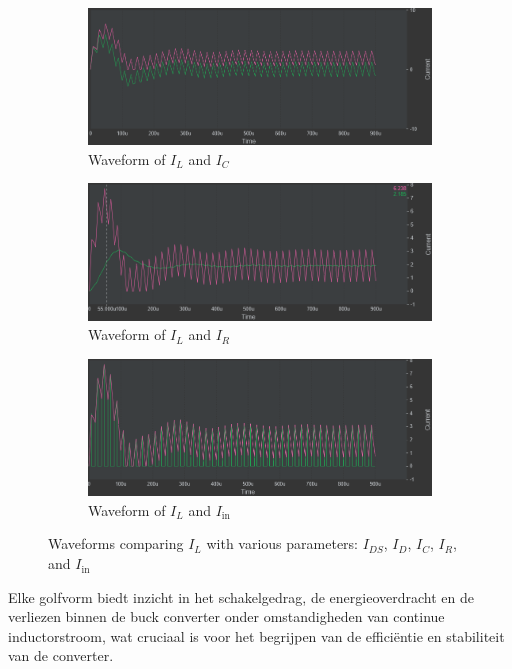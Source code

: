 \begin{figure}[h!]
    \begin{subfigure}[b]{0.45\linewidth}
        \centering
        \includegraphics[width=\linewidth]{img/hfd2/IL-IC.png}
        \caption{Waveform of \(I_{L}\) and \(I_{C}\)}
        \label{fig:Waveform_IL_IC}
    \end{subfigure}
    \hfill
    \begin{subfigure}[b]{0.45\linewidth}
        \centering
        \includegraphics[width=\linewidth]{img/hfd2/IL-IR.png}
        \caption{Waveform of \(I_{L}\) and \(I_{R}\)}
        \label{fig:Waveform_IL_IR}
    \end{subfigure}
    
    \begin{subfigure}[b]{0.45\linewidth}
        \centering
        \includegraphics[width=\linewidth]{img/hfd2/IL-Lin.png}
        \caption{Waveform of \(I_{L}\) and \(I_{\text{in}}\)}
        \label{fig:Waveform_IL_Lin}
    \end{subfigure}
    
    \caption{Waveforms comparing \(I_{L}\) with various parameters: \(I_{DS}\), \(I_{D}\), \(I_{C}\), \(I_{R}\), and \(I_{\text{in}}\)}
    \label{fig:Waveforms_IL_all}
\end{figure}

Elke golfvorm biedt inzicht in het schakelgedrag, de energieoverdracht en de verliezen binnen de buck converter onder omstandigheden van continue inductorstroom, wat cruciaal is voor het begrijpen van de efficiëntie en stabiliteit van de converter.